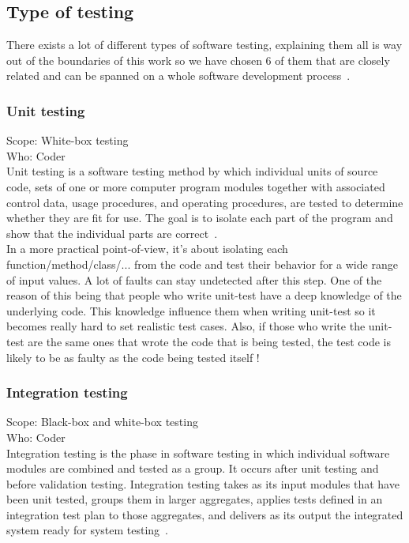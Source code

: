 \documentclass[12pt]{article}
\theoremstyle{definition}
\theoremstyle{definition}
\begin{document}
\subsection{Type of testing}

There exists a lot of different types of software testing, explaining them all is way out of the boundaries of this work so we have chosen 6 of them that are closely related and can be spanned on a whole software development process~\cite{Laurie.W:Black-box}.

\subsubsection{Unit testing}

Scope: White-box testing\\
Who: Coder\\

Unit testing is a software testing method by which individual units of source code, sets of one or more computer program modules together with associated control data, usage procedures, and operating procedures, are tested to determine whether they are fit for use. The goal is to isolate each part of the program and show that the individual parts are correct~\cite{AutomatedDefectPrevention:2007}.\\

In a more practical point-of-view, it's about isolating each function/method/class/... from the code and test their behavior for a wide range of input values. A lot of faults can stay undetected after this step. One of the reason of this being that people who write unit-test have a deep knowledge of the underlying code. This knowledge influence them when writing unit-test so it becomes really hard to set realistic test cases. Also, if those who write the unit-test are the same ones that wrote the code that is being tested, the test code is likely to be as faulty as the code being tested itself !

\subsubsection{Integration testing}

Scope: Black-box and white-box testing\\
Who: Coder\\

Integration testing is the phase in software testing in which individual software modules are combined and tested as a group. It occurs after unit testing and before validation testing. Integration testing takes as its input modules that have been unit tested, groups them in larger aggregates, applies tests defined in an integration test plan to those aggregates, and delivers as its output the integrated system ready for system testing~\cite{TestingInSoftwareDevelopment:1987}.
\end{document}
